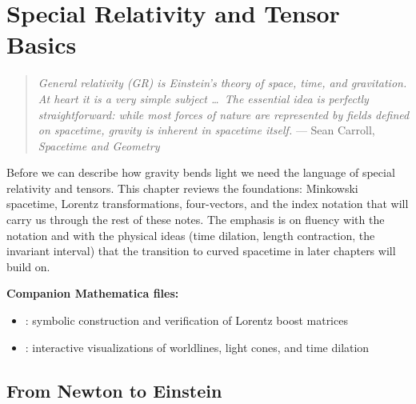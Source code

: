 
\chapter{Special Relativity and Tensor Basics}
\label{ch:special_relativity}

\begin{quote}
\textit{General relativity (GR) is Einstein's theory of space, time, and gravitation.
At heart it is a very simple subject \ldots\ The essential idea is perfectly
straightforward: while most forces of nature are represented by fields defined
on spacetime, gravity is inherent in spacetime itself.}
\hfill --- Sean Carroll, \textit{Spacetime and Geometry}
\end{quote}

\noindent
Before we can describe how gravity bends light we need the language of
special relativity and tensors.  This chapter reviews the foundations:
Minkowski spacetime, Lorentz transformations, four-vectors, and the index
notation that will carry us through the rest of these notes.  The emphasis is
on fluency with the notation and with the physical ideas (time dilation,
length contraction, the invariant interval) that the transition to curved
spacetime in later chapters will build on.

\medskip
\noindent
\textbf{Companion Mathematica files:}
\begin{itemize}[nosep]
    \item {}:
          symbolic construction and verification of Lorentz boost matrices
    \item {}:
          interactive visualizations of worldlines, light cones, and time dilation
\end{itemize}

\section{From Newton to Einstein}
\label{sec:newton_to_einstein}

